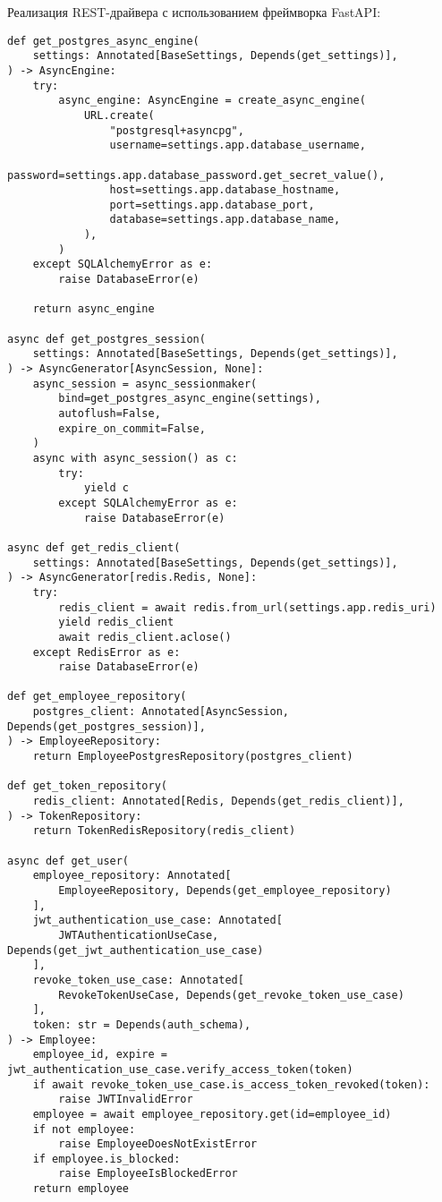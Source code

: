 \noindent
Реализация REST-драйвера с использованием фреймворка FastAPI:

\begin{lstlisting}[style=pythonstyle]
def get_postgres_async_engine(
    settings: Annotated[BaseSettings, Depends(get_settings)],
) -> AsyncEngine:
    try:
        async_engine: AsyncEngine = create_async_engine(
            URL.create(
                "postgresql+asyncpg",
                username=settings.app.database_username,
                password=settings.app.database_password.get_secret_value(),
                host=settings.app.database_hostname,
                port=settings.app.database_port,
                database=settings.app.database_name,
            ),
        )
    except SQLAlchemyError as e:
        raise DatabaseError(e)

    return async_engine

async def get_postgres_session(
    settings: Annotated[BaseSettings, Depends(get_settings)],
) -> AsyncGenerator[AsyncSession, None]:
    async_session = async_sessionmaker(
        bind=get_postgres_async_engine(settings),
        autoflush=False,
        expire_on_commit=False,
    )
    async with async_session() as c:
        try:
            yield c
        except SQLAlchemyError as e:
            raise DatabaseError(e)

async def get_redis_client(
    settings: Annotated[BaseSettings, Depends(get_settings)],
) -> AsyncGenerator[redis.Redis, None]:
    try:
        redis_client = await redis.from_url(settings.app.redis_uri)
        yield redis_client
        await redis_client.aclose()
    except RedisError as e:
        raise DatabaseError(e)

def get_employee_repository(
    postgres_client: Annotated[AsyncSession, Depends(get_postgres_session)],
) -> EmployeeRepository:
    return EmployeePostgresRepository(postgres_client)

def get_token_repository(
    redis_client: Annotated[Redis, Depends(get_redis_client)],
) -> TokenRepository:
    return TokenRedisRepository(redis_client)

async def get_user(
    employee_repository: Annotated[
        EmployeeRepository, Depends(get_employee_repository)
    ],
    jwt_authentication_use_case: Annotated[
        JWTAuthenticationUseCase, Depends(get_jwt_authentication_use_case)
    ],
    revoke_token_use_case: Annotated[
        RevokeTokenUseCase, Depends(get_revoke_token_use_case)
    ],
    token: str = Depends(auth_schema),
) -> Employee:
    employee_id, expire = jwt_authentication_use_case.verify_access_token(token)
    if await revoke_token_use_case.is_access_token_revoked(token):
        raise JWTInvalidError
    employee = await employee_repository.get(id=employee_id)
    if not employee:
        raise EmployeeDoesNotExistError
    if employee.is_blocked:
        raise EmployeeIsBlockedError
    return employee


\end{lstlisting}
